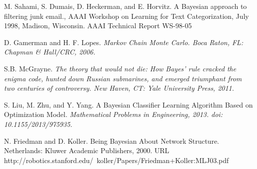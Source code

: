 \documentclass[12pt,twoside]{reedthesis}
\begin{document}
\newpage
\begin{thebibliography}{1}

 M. Sahami, S. Dumais, D. Heckerman, and E. Horvitz. A Bayesian approach to filtering junk email., AAAI Workshop on Learning for Text Categorization, July 1998, Madison, Wisconsin. AAAI Technical Report WS-98-05

 D. Gamerman and H. F. Lopes. \em{Markov Chain Monte Carlo}. Boca Raton, FL: Chapman \& Hall/CRC, 2006.

 S.B. McGrayne. \em{The theory that would not die: How Bayes' rule cracked the enigma code, hunted down Russian submarines, and emerged triumphant from two centuries of controversy}. New Haven, CT: Yale University Press, 2011.

 S. Liu, M. Zhu, and Y. Yang. A Bayesian Classifier Learning Algorithm Based on Optimization Model. \em{Mathematical Problems in Engineering}, {2013}. doi: 10.1155/2013/975935. %

 N. Friedman and D. Koller. Being Bayesian About Network Structure. Netherlands: Kluwer Academic Publishers, 2000. URL http://robotics.stanford.edu/~koller/Papers/Friedman+Koller:MLJ03.pdf

\end{thebibliography}


%  

\end{document}

